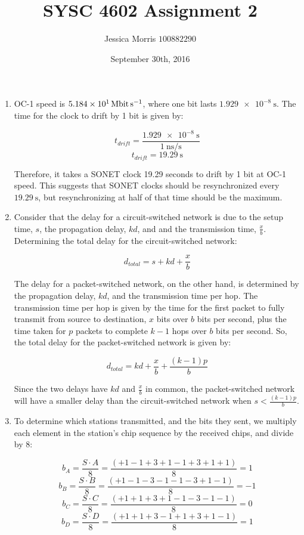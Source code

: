 \documentclass{article}
\title{SYSC 4602 Assignment 2}
\date{September 30th, 2016}
\author{Jessica Morris \(100882290\)}
\begin{document}
\maketitle

\begin{enumerate}

\item OC-1 speed is $ \SI{51.84}{\mega\bit\per\second} $, where one bit lasts $ \SI{1.929e-8}{\second} $. The time for the clock to drift by 1 bit is given by:

$$ t_{drift} = \frac{\SI{1.929e-8}{\second}}{\SI{1}{\nano\second\per\second}}$$
$$ t_{drift} = \SI{19.29}{\second} $$

Therefore, it takes a SONET clock 19.29 seconds to drift by 1 bit at OC-1 speed. This suggests that SONET clocks should be resynchronized every $ \SI{19.29}{\second} $, but resynchronizing at half of that time should be the maximum.

\item Consider that the delay for a circuit-switched network is due to the setup time, $s$, the propagation delay, $kd$, and and the transmission time, $\frac{x}{b}$. Determining the total delay for the circuit-switched network:

$$ d_{total} = s + kd + \frac{x}{b} $$

The delay for a packet-switched network, on the other hand, is determined by the propagation delay, $kd$, and the transmission time per hop. The transmission time per hop is given by the time for the first packet to fully transmit from source to destination, $x$ bits over $b$ bits per second, plus the time taken for $p$ packets to complete $k-1$ hops over $b$ bits per second. So, the total delay for the packet-switched network is given by:

$$ d_{total} = kd + \frac{x}{b} + \frac{(k-1)p}{b} $$

Since the two delays have $kd$ and $\frac{x}{b}$ in common, the packet-switched network will have a smaller delay than the circuit-switched network when $s < \frac{(k-1)p}{b}$.

\item To determine which stations transmitted, and the bits they sent, we multiply each element in the station's chip sequence by the received chips, and divide by 8:

$$ b_A = \frac{S \cdot A}{8} = \frac{(+1 -1 +3 +1 -1 +3 +1 +1)}{8} = 1 $$
$$ b_B = \frac{S \cdot B}{8} = \frac{(+1 -1 -3 -1 -1 -3 +1 -1)}{8} = -1 $$
$$ b_C = \frac{S \cdot C}{8} = \frac{(+1 +1 +3 +1 -1 -3 -1 -1)}{8} = 0 $$
$$ b_D = \frac{S \cdot D}{8} = \frac{(+1 +1 +3 -1 +1 +3 +1 -1)}{8} = 1 $$


\end{enumerate}
\end{document}
